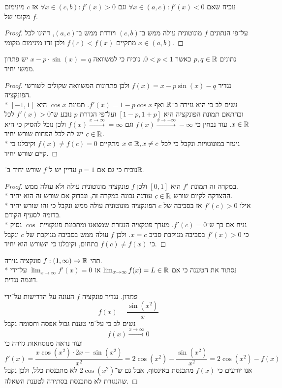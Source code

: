 \Subquestion{}
נוכיח שאם $\forall x \in (a, c) : f'(x) < 0$ וגם $\forall x \in (c, b) : f'(x) > 0$ אז $c$ מינימום מקומי של $f$.
\begin{proof}
	על־פי הנתונים $f$ מונוטונית עולה ממש ב־$(c, b)$ ויורדת ממש ב־$(a, c)$, דהינו לכל $x \in (a, b)$ מתקיים $f(c) < f(x)$ ולכן זהו מינימום מקומי.
\end{proof}

\Question{}
\Subquestion{}
נתונים $p, q \in \mathbb{R}$ כאשר $0 < p < 1$. נוכיח כי למשוואה $x - p \cdot \sin(x) = q$ יש פתרון ממשי יחיד.
\begin{proof}
	נגדיר $f(x) = x - p \sin(x) - q$ ולכן פתרונות המשוואה שקולים לשורשי הפונקציה. \\*
	נשים לב כי היא גזירה ב־$\mathbb{R}$ ואף $f'(x) = 1 - p \cos x$. תמונת $\cos x$ היא $[-1, 1]$ ובהתאם תמונת הפונקציה היא $[1 - p, 1 + p]$ ועל־פי הגדרת $p$ נובע ש־$f'(x) > 0$ לכל $x \in \mathbb{R}$.
	עוד נבחין כי $f(x) \xrightarrow{x \to -\infty} -\infty$ וגם $f(x) \xrightarrow{x \to \infty} = \infty$ ולכן נוכל להסיק כי היא יש לה לכל הפחות שורש יחיד $c \in \mathbb{R}$. \\*
	ניעזר במונוטויות ונקבל כי לכל $x \in \mathbb{R}, x \ne c$ מתקיים $f(x) \ne f(c) = 0$ וקיבלנו כי קיים שורש יחיד.
\end{proof}

\Subquestion{}
נוכיח כי גם אם $p = 1$ עדיין יש ל־$f$ שורש יחיד ב־$\mathbb{R}$.
\begin{proof}
	במקרה זה תמונת $f'$ היא $[0, 1]$ ולכן $f$ פונקציה מונוטונית עולה ולא עולה ממש. \\*
	ההצדקה לקיום שורש $c \in \mathbb{R}$ עודנה נכונה במקרה זה, ונבדוק אם שורש זה הוא יחיד. \\*
	אילו $f'(c) > 0$ אז בסביבה של $c$ הפונקציה מונוטונית עולה ממש ונקבל כי זהו שורש יחיד בדומה לסעיף הקודם. \\*
	נניח אם כך ש־$f'(c) = 0$. מערך פונקציה הנגזרת שמצאנו ומתכונת פונקציית $\cos$ נסיק כי $f'(x) > 0$ בסביבה מנוקבת סביב $x = c$.
	ולכן $f$ עולה ממש בסביבה מנוקבת של $c$ ונקבל כי $f(c) \ne f(x)$ בתחום, וקיבלנו כי השורש הוא יחיד.
\end{proof}

\Question{}
תהי $f : (1, \infty) \to \mathbb{R}$ פונקציה גזירה. \\*
נסתור את הטענה כי אם $\lim_{x \to \infty} f(x) = L \in \mathbb{R}$ אז $\lim_{x \to \infty} f'(x) = 0$ על־ידי דוגמה נגדית.
\begin{proof}[פתרון]
	נגדיר פונקציה $f$ העונה על הדרישות על־ידי
	\[
		f(x) = \frac{\sin(x^2)}{x}
	\]
	נשים לב כי על־פי טענת גבול אפסה וחסומה נקבל
	\[
		f(x) \xrightarrow{x \to \infty} 0
	\]
	ועוד נראה מנוסחאות גזירה כי
	\[
		f'(x) = \frac{x \cos(x^2) \cdot 2x - \sin(x^2)}{x^2} = 2 \cos(x^2) - \frac{\sin(x^2)}{x^2} = 2 \cos(x^2) - f(x)
	\]
	אנו יודעים כי $f(x)$ מתכנסת באינסוף, אבל גם ש־$2\cos(x^2)$ לא מתכנסת כלל, ולכן נקבל שהנגזרת לא מתכנסת בסתירה לטענת השאלה.
\end{proof}

